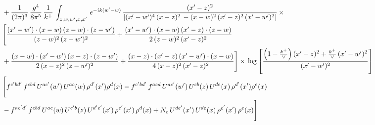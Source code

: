 \documentclass[9pt]{article}
\numberwithin{equation}{section}
\begin{document}
\begin{align}
&  + \frac{1}{(2\pi)^{3}}\, \frac{g^{4}}{8\pi^{5}}\,\frac{1}{k^{+}}\,\int_{z,w,w^{\prime},x,x'}\, e^{-ik(w^{\prime}-w)}\, \frac{(x'-z)^{2}}{\left[(x'-w')^{4}\,(x-z)^{2}\, - (x-w)^{2}\, (x'-z)^{2}\,(x'-w')^{2}\right]}\,  \times\notag \\ & \Bigg[\frac{(x'-w')\cdot (x-w)\, (z-w)\cdot (z-w')}{(z-w)^{2}\, (z-w')^{2}}+\frac{(x'-w')\cdot (x-w)\, (x'-z)\cdot (z-w)}{2\, (z-w)^{2}\, (x'-z)^{2}}\notag \\ & +\frac{(x-w)\cdot (x'-w')\, (x-z)\cdot (z-w')}{2\, (x-z)^{2}\, (z-w')^{2}}+\frac{(x-z)\cdot (x'-z)\, (x'-w')\cdot (x-w)}{4\, (x-z)^{2}\, (x'-z)^{2}}\Bigg] \times\,\log{\left[\frac{\left(1-\frac{k^{+}}{\vee}\right)(x'-z)^{2}+\frac{k^{+}}{\vee}\,(x'-w')^{2}}{(x'-w')^{2}}\right]} \notag \\ & \Bigg[f^{c'bd'}\,f^{cbd}\, U^{ac'}(w')\,U^{ac}(w)\,\rho^{d'}(x')\rho^{d}(x)- f^{c'bd'}\,f^{acd}\,U^{ac'}(w')\,U^{cb}(z)\,U^{de}(x)\,\rho^{d'}(x')\rho^{e}(x) \notag \\ & -f^{ac'd'}\,f^{cbd}\,U^{ac}(w)\,U^{c'b}(z)\,U^{d'e'}(x')\,\rho^{e'}(x')\,\rho^{d}(x) +N_{c}\,U^{de'}(x')\,U^{de}(x)\,\rho^{e'}(x')\,\rho^{e}(x)\Bigg]
\end{align}
\end{document}
